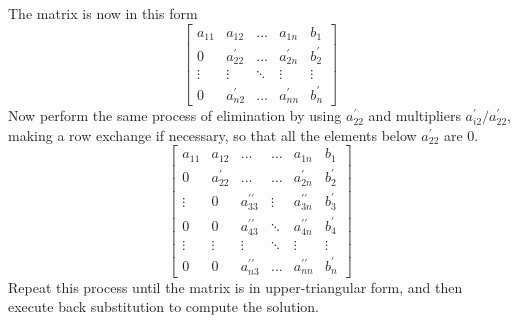 \documentclass[../main.tex]{subfiles}
\begin{document}
The matrix is now in this form
$$
\left[\begin{array}{cccc|c}
a_{11} & a_{12} & \ldots & a_{1 n} & b_{1} \\
0 & a_{22}^{\prime} & \ldots & a_{2 n}^{\prime} & b_{2}^{\prime} \\
\vdots & \vdots & \ddots & \vdots & \vdots \\
0 & a_{n 2}^{\prime} & \ldots & a_{n n}^{\prime} & b_{n}^{\prime}
\end{array}\right]
$$
Now perform the same process of elimination by using $a_{22}^{\prime}$ and multipliers $a_{i 2}^{\prime} / a_{22}^{\prime}$, making a row exchange if necessary, so that all the elements below $a_{22}^{\prime}$ are $0 .$
$$
\left[\begin{array}{ccccc|c}
a_{11} & a_{12} & \ldots & \ldots & a_{1 n} & b_{1} \\
0 & a_{22}^{\prime} & \ldots & \ldots & a_{2 n}^{\prime} & b_{2}^{\prime} \\
\vdots & 0 & a_{33}^{\prime \prime} & \vdots & a_{3 n}^{\prime \prime} & b_{3}^{\prime} \\
0 & 0 & a_{43}^{\prime \prime} & \ddots & a_{4 n}^{\prime \prime} & b_{4}^{\prime} \\
\vdots & \vdots & \vdots & \ddots & \vdots & \vdots \\
0 & 0 & a_{n 3}^{\prime \prime} & \ldots & a_{n n}^{\prime \prime} & b_{n}^{\prime}
\end{array}\right]
$$
Repeat this process until the matrix is in upper-triangular form, and then execute back substitution to compute the solution.
\end{document}

